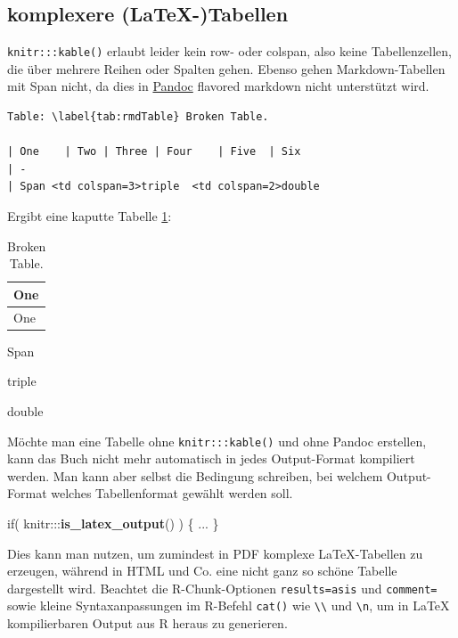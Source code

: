 \documentclass[]{book}
\makeatletter
\newenvironment{Shaded}{\begin{snugshade}}{\end{snugshade}}
\newcommand{\KeywordTok}[1]{\textcolor[rgb]{0.13,0.29,0.53}{\textbf{{#1}}}}
\newcommand{\NormalTok}[1]{{#1}}
\newenvironment{kframe}{%
\medskip{}
\setlength{\fboxsep}{.8em}
 \def\at@end@of@kframe{}%
 \ifinner\ifhmode%
  \def\at@end@of@kframe{\end{minipage}}%
  \begin{minipage}{\columnwidth}%
 \fi\fi%
 \def\FrameCommand##1{\hskip\@totalleftmargin \hskip-\fboxsep
 \colorbox{shadecolor}{##1}\hskip-\fboxsep
     \hskip-\linewidth \hskip-\@totalleftmargin \hskip\columnwidth}%
 \MakeFramed {\advance\hsize-\width
   \@totalleftmargin\z@ \linewidth\hsize
   \@setminipage}}%
 {\par\unskip\endMakeFramed%
 \at@end@of@kframe}
\renewenvironment{Shaded}{\begin{kframe}}{\end{kframe}}
\theoremstyle{definition}
\theoremstyle{definition}
\theoremstyle{remark}
\makeatother
\begin{document}
\subsection{komplexere (LaTeX-)Tabellen}\label{complexTables}

\texttt{knitr:::kable()} erlaubt leider kein row- oder colspan, also
keine Tabellenzellen, die über mehrere Reihen oder Spalten gehen. Ebenso
gehen Markdown-Tabellen mit Span nicht, da dies in
\href{http://www.pandoc.org/MANUAL.html\#tables}{Pandoc} flavored
markdown nicht unterstützt wird.

\begin{verbatim}
Table: \label{tab:rmdTable} Broken Table.

| One    | Two | Three | Four    | Five  | Six 
| -
| Span <td colspan=3>triple  <td colspan=2>double
\end{verbatim}

Ergibt eine kaputte Tabelle \ref{tab:rmdTable}:

\begin{longtable}[]{@{}l@{}}
\caption{\label{tab:rmdTable}Broken Table.}\tabularnewline
\toprule
One\tabularnewline
\midrule
\endfirsthead
\toprule
One\tabularnewline
\midrule
\endhead
\bottomrule
\end{longtable}

\textbar{} Span

triple

double

Möchte man eine Tabelle ohne \texttt{knitr:::kable()} und ohne Pandoc
erstellen, kann das Buch nicht mehr automatisch in jedes Output-Format
kompiliert werden. Man kann aber selbst die Bedingung schreiben, bei
welchem Output-Format welches Tabellenformat gewählt werden soll.

\begin{Shaded}
\begin{Highlighting}[]
\NormalTok{if( knitr:::}\KeywordTok{is_latex_output}\NormalTok{() ) \{ ... \}}
\end{Highlighting}
\end{Shaded}

Dies kann man nutzen, um zumindest in PDF komplexe LaTeX-Tabellen zu
erzeugen, während in HTML und Co. eine nicht ganz so schöne Tabelle
dargestellt wird. Beachtet die R-Chunk-Optionen
\texttt{results=\textquotesingle{}asis} und
\texttt{comment=\textquotesingle{}\textquotesingle{}} sowie kleine
Syntaxanpassungen im R-Befehl \texttt{cat()} wie
\texttt{\textbackslash{}\textbackslash{}} und
\texttt{\textbackslash{}n}, um in LaTeX kompilierbaren Output aus R
heraus zu generieren.
\end{document}
